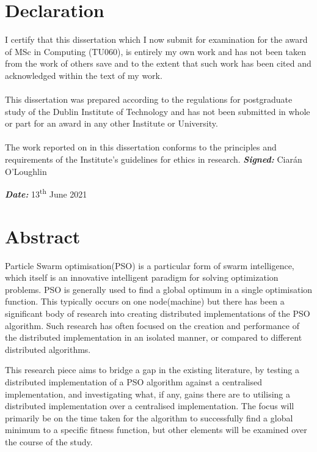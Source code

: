 \documentclass[oneside,12pt]{book}
\begin{document}
\chapter*{Declaration}
I certify that this dissertation which I now submit for examination for the award of
MSc in Computing (TU060), is entirely my own work and has not been taken
from the work of others save and to the extent that such work has been cited and
acknowledged within the text of my work.
\\
\\
This dissertation was prepared according to the regulations for postgraduate study of
the Dublin Institute of Technology and has not been submitted in whole or part for an
award in any other Institute or University.
\\
\\
The work reported on in this dissertation conforms to the principles and requirements
of the Institute’s guidelines for ethics in research.
\vfill
\noindent
\textit{\textbf{Signed:}} Ciarán O'Loughlin 

\noindent
\textit{\textbf{Date:}} 13\textsuperscript{th} June 2021
\vspace{0.8cm}

\chapter*{Abstract}
\par 
Particle Swarm optimisation(PSO) is a particular form of swarm intelligence, which itself is an innovative intelligent paradigm for solving optimization problems. PSO is generally used to find a global optimum in a single optimisation function. This typically occurs on one node(machine) but there has been a significant body of research into creating distributed implementations of the PSO algorithm. Such research has often focused on the creation and performance of the distributed implementation in an isolated manner, or compared to different distributed algorithms. 

This research piece aims to bridge a gap in the existing literature, by testing a distributed implementation of a PSO algorithm against a centralised implementation, and investigating what, if any, gains there are to utilising a distributed implementation over a centralised implementation. The focus will primarily be on the time taken for the algorithm to successfully find a global minimum to a specific fitness function, but other elements will be examined over the course of the study.  
\end{document}
